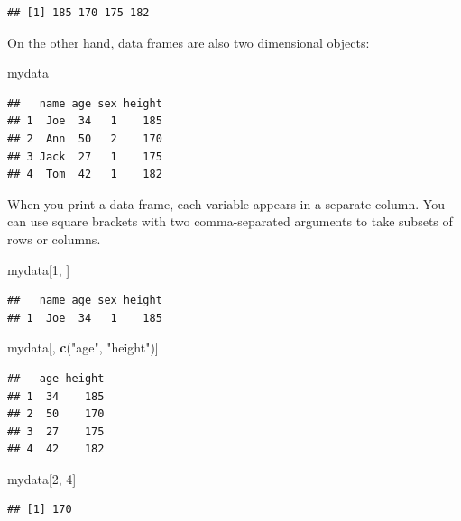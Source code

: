 \documentclass[
]{book}
\newenvironment{Shaded}{\begin{snugshade}}{\end{snugshade}}
\newcommand{\DecValTok}[1]{\textcolor[rgb]{0.00,0.00,0.81}{#1}}
\newcommand{\FunctionTok}[1]{\textcolor[rgb]{0.13,0.29,0.53}{\textbf{#1}}}
\newcommand{\NormalTok}[1]{#1}
\newcommand{\StringTok}[1]{\textcolor[rgb]{0.31,0.60,0.02}{#1}}
\begin{document}
\begin{verbatim}
## [1] 185 170 175 182
\end{verbatim}

On the other hand, data frames are also two dimensional objects:

\begin{Shaded}
\begin{Highlighting}[]
\NormalTok{mydata}
\end{Highlighting}
\end{Shaded}

\begin{verbatim}
##   name age sex height
## 1  Joe  34   1    185
## 2  Ann  50   2    170
## 3 Jack  27   1    175
## 4  Tom  42   1    182
\end{verbatim}

When you print a data frame, each variable appears in a separate
column. You can use square brackets with two comma-separated
arguments to take subsets of rows or columns.

\begin{Shaded}
\begin{Highlighting}[]
\NormalTok{mydata[}\DecValTok{1}\NormalTok{, ]}
\end{Highlighting}
\end{Shaded}

\begin{verbatim}
##   name age sex height
## 1  Joe  34   1    185
\end{verbatim}

\begin{Shaded}
\begin{Highlighting}[]
\NormalTok{mydata[, }\FunctionTok{c}\NormalTok{(}\StringTok{"age"}\NormalTok{, }\StringTok{"height"}\NormalTok{)]}
\end{Highlighting}
\end{Shaded}

\begin{verbatim}
##   age height
## 1  34    185
## 2  50    170
## 3  27    175
## 4  42    182
\end{verbatim}

\begin{Shaded}
\begin{Highlighting}[]
\NormalTok{mydata[}\DecValTok{2}\NormalTok{, }\DecValTok{4}\NormalTok{]}
\end{Highlighting}
\end{Shaded}

\begin{verbatim}
## [1] 170
\end{verbatim}
\end{document}
